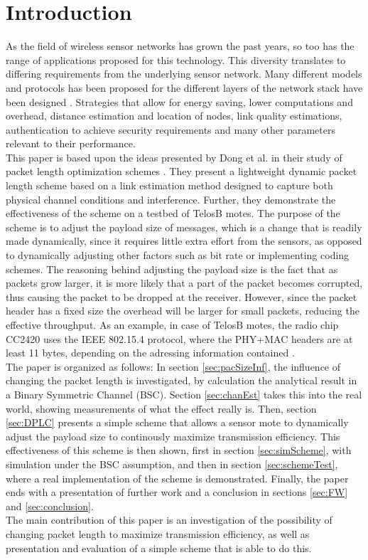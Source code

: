 \section{Introduction}
As the field of wireless sensor networks has grown the past years, so too has the range of applications proposed for this technology. This diversity translates to differing requirements from the underlying sensor network. Many different models and protocols has been proposed for the different layers of the
network stack have been designed \cite{WSNpaper}. Strategies that allow for energy saving, lower computations  and overhead, distance estimation and location of nodes, link quality estimations, authentication to achieve security requirements and many other parameters relevant to their performance.
\\[8pt]
This paper is based upon the ideas presented by Dong et al. in their study of packet length optimization schemes \cite{DPLCpaper}. They present a lightweight dynamic packet length scheme based on a link estimation method designed to capture both physical channel conditions and interference. Further, they demonstrate the effectiveness of the scheme on a testbed of TelosB motes. The purpose of the scheme is to adjust the payload size of messages, which is a change that is readily made dynamically, since it requires little extra effort from the sensors, as opposed to dynamically adjusting other factors such as bit rate or implementing coding schemes. The reasoning behind adjusting the payload size is the fact that as packets grow larger, it is more likely that a part of the packet becomes corrupted, thus causing the packet to be dropped at the receiver. However, since the packet header has a fixed size the overhead will be larger for small packets, reducing the effective throughput. As an example, in case of TelosB motes, the radio chip CC2420 uses the IEEE 802.15.4 protocol, where the PHY+MAC headers are at least 11 bytes, depending on the adressing information contained \cite{CC2420}.
\\[8pt]
The paper is organized as follows: In section \ref{sec:pacSizeInf}, the influence of changing the packet length is investigated, by calculation the analytical result in a Binary Symmetric Channel (BSC). Section \ref{sec:chanEst} takes this into the real world, showing measurements of what the effect really is. Then, section \ref{sec:DPLC} presents a simple scheme that allows a sensor mote to dynamically adjust the payload size to continously maximize transmission efficiency. This effectiveness of this scheme is then shown, first in section \ref{sec:simScheme}, with simulation under the BSC assumption, and then in section \ref{sec:schemeTest}, where a real implementation of the scheme is demonstrated. Finally, the paper ends with a presentation of further work and a conclusion in sections \ref{sec:FW} and \ref{sec:conclusion}.
\\[8pt]
The main contribution of this paper is an investigation of the possibility of changing packet length to maximize transmission efficiency, as well as presentation and evaluation of a simple scheme that is able to do this.
